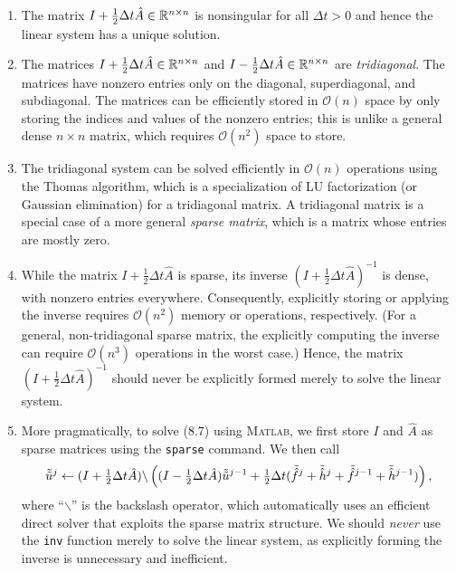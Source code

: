 \begin{enumerate}
    \item The matrix $I + \frac{1}{2}\Delta t\hat{A} \in \mathbb{R}^{n \times n}$ is nonsingular for all $\Delta t > 0$ and hence the linear system has a unique solution.
    \item The matrices $I + \frac{1}{2}\Delta t\hat{A} \in \mathbb{R}^{n \times n}$ and $I - \frac{1}{2}\Delta t\hat{A} \in \mathbb{R}^{n \times n}$ are \textit{tridiagonal}. The matrices have nonzero entries only on the diagonal, superdiagonal, and subdiagonal. The matrices can be efficiently stored in $\mathcal{O}(n)$ space by only storing the indices and values of the nonzero entries; this is unlike a general dense $n \times n$ matrix, which requires $\mathcal{O}(n^2)$ space to store.
    \item The tridiagonal system can be solved efficiently in $\mathcal{O}(n)$ operations using the Thomas algorithm, which is a specialization of LU factorization (or Gaussian elimination) for a tridiagonal matrix. A tridiagonal matrix is a special case of a more general \textit{sparse matrix}, which is a matrix whose entries are mostly zero.
    \item While the matrix $I + \frac{1}{2}\Delta t\hat{A}$ is sparse, its inverse $(I + \frac{1}{2}\Delta t\hat{A})^{-1}$ is dense, with nonzero entries everywhere. Consequently, explicitly storing or applying the inverse requires $\mathcal{O}(n^2)$ memory or operations, respectively. (For a general, non-tridiagonal sparse matrix, the explicitly computing the inverse can require $\mathcal{O}(n^3)$ operations in the worst case.) Hence, the matrix $(I + \frac{1}{2}\Delta t\hat{A})^{-1}$ should never be explicitly formed merely to solve the linear system.
    \item More pragmatically, to solve (8.7) using \textsc{Matlab}, we first store $I$ and $\hat{A}$ as sparse matrices using the \texttt{sparse} command. We then call
    \[\tilde{\tilde{u}}^j \leftarrow (I + \tfrac{1}{2}\Delta t\hat{A}) \backslash \left((I - \tfrac{1}{2}\Delta t\hat{A})\tilde{\tilde{u}}^{j-1} + \tfrac{1}{2}\Delta t(\tilde{\hat{f}}^j + \tilde{\hat{h}}^j + \tilde{\hat{f}}^{j-1} + \tilde{\hat{h}}^{j-1})\right),\]
    where ``$\backslash$'' is the backslash operator, which automatically uses an efficient direct solver that exploits the sparse matrix structure. We should \textit{never} use the \texttt{inv} function merely to solve the linear system, as explicitly forming the inverse is unnecessary and inefficient.
\end{enumerate}

